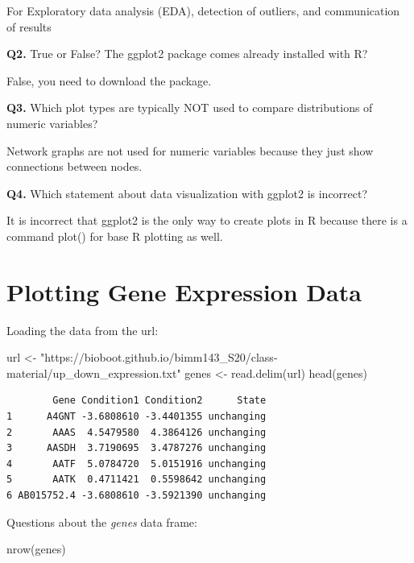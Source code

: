\documentclass[
  letterpaper,
  DIV=11,
  numbers=noendperiod]{scrartcl}
\newenvironment{Shaded}{\begin{snugshade}}{\end{snugshade}}
\newcommand{\FunctionTok}[1]{\textcolor[rgb]{0.28,0.35,0.67}{#1}}
\newcommand{\NormalTok}[1]{\textcolor[rgb]{0.00,0.23,0.31}{#1}}
\newcommand{\OtherTok}[1]{\textcolor[rgb]{0.00,0.23,0.31}{#1}}
\newcommand{\StringTok}[1]{\textcolor[rgb]{0.13,0.47,0.30}{#1}}
\begin{document}
For Exploratory data analysis (EDA), detection of outliers, and
communication of results

\textbf{Q2.} True or False? The ggplot2 package comes already installed
with R?

False, you need to download the package.

\textbf{Q3.} Which plot types are typically NOT used to compare
distributions of numeric variables?

Network graphs are not used for numeric variables because they just show
connections between nodes.

\textbf{Q4.} Which statement about data visualization with ggplot2 is
incorrect?

It is incorrect that ggplot2 is the only way to create plots in R
because there is a command plot() for base R plotting as well.

\hypertarget{plotting-gene-expression-data}{%
\section{Plotting Gene Expression
Data}\label{plotting-gene-expression-data}}

Loading the data from the url:

\begin{Shaded}
\begin{Highlighting}[]
\NormalTok{url }\OtherTok{\textless{}{-}} \StringTok{"https://bioboot.github.io/bimm143\_S20/class{-}material/up\_down\_expression.txt"}
\NormalTok{genes }\OtherTok{\textless{}{-}} \FunctionTok{read.delim}\NormalTok{(url)}
\FunctionTok{head}\NormalTok{(genes)}
\end{Highlighting}
\end{Shaded}

\begin{verbatim}
        Gene Condition1 Condition2      State
1      A4GNT -3.6808610 -3.4401355 unchanging
2       AAAS  4.5479580  4.3864126 unchanging
3      AASDH  3.7190695  3.4787276 unchanging
4       AATF  5.0784720  5.0151916 unchanging
5       AATK  0.4711421  0.5598642 unchanging
6 AB015752.4 -3.6808610 -3.5921390 unchanging
\end{verbatim}

Questions about the \emph{genes} data frame:

\begin{Shaded}
\begin{Highlighting}[]
\FunctionTok{nrow}\NormalTok{(genes)}
\end{Highlighting}
\end{Shaded}
\end{document}
